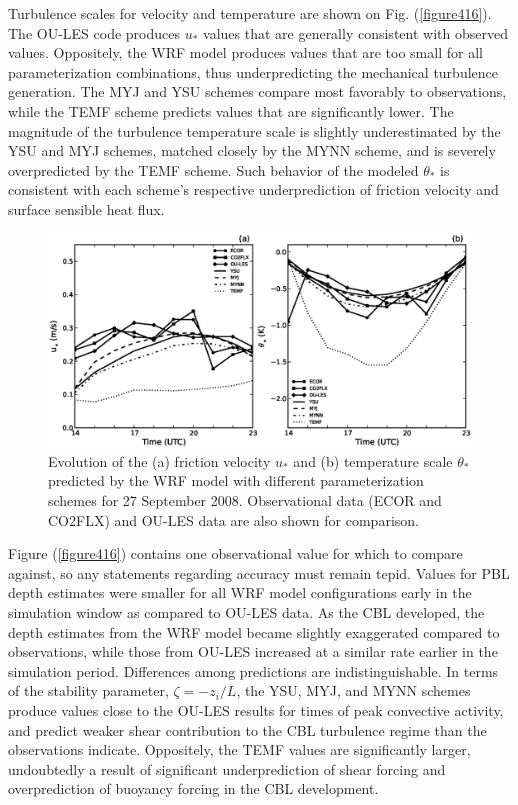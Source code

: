 Turbulence scales for velocity and temperature are shown on Fig. (\autoref{figure416}). The OU-LES code produces $u_*$ values that are generally consistent with observed values. Oppositely, the WRF model produces values that are too small for all parameterization combinations, thus underpredicting the mechanical turbulence generation. The MYJ and YSU schemes compare most favorably to observations, while the TEMF scheme predicts values that are significantly lower. The magnitude of the turbulence temperature scale is slightly underestimated by the YSU and MYJ schemes, matched closely by the MYNN scheme, and is severely overpredicted by the TEMF scheme. Such behavior of the modeled $\theta_*$ is consistent with each scheme's respective underprediction of friction velocity and surface sensible heat flux.


\begin{figure}[ht!]
\begin{center}
\includegraphics[width=\textwidth]{figures/chapter4/ust_tst_phys_20080927}
\end{center}
\caption{Evolution of the (a) friction velocity $u_*$ and (b) temperature scale $\theta_*$ predicted by the WRF model with different parameterization schemes for 27 September 2008. Observational data (ECOR and CO2FLX) and OU-LES data are also shown for comparison.}
\label{figure416}
\end{figure}


Figure (\autoref{figure416}) contains one observational value for which to compare against, so any statements regarding accuracy must remain tepid. Values for PBL depth estimates were smaller for all WRF model configurations early in the simulation window as compared to OU-LES data. As the CBL developed, the depth estimates from the WRF model became slightly exaggerated compared to observations, while those from OU-LES increased at a similar rate earlier in the simulation period. Differences among predictions are indistinguishable. In terms of the stability parameter, $\zeta = -z_i / L$, the YSU, MYJ, and MYNN schemes produce values close to the OU-LES results for times of peak convective activity, and predict weaker shear contribution to the CBL turbulence regime than the observations indicate. Oppositely, the TEMF values are significantly larger, undoubtedly a result of significant underprediction of shear forcing and overprediction of buoyancy forcing in the CBL development. 


